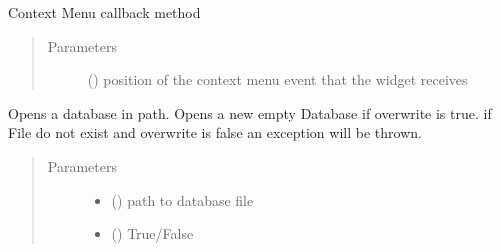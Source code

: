 \documentclass[letterpaper,10pt,english]{sphinxmanual}
\begin{document}
\begin{fulllineitems}
\begin{fulllineitems}
\end{fulllineitems}


\begin{fulllineitems}
\label{\detokenize{api:beamon.ui.main.Main.onCustomContextMenuRequested}}
Context Menu callback method
\begin{quote}\begin{description}
\item[{Parameters}] \leavevmode
{} () \textendash{} position of the context menu event that the widget receives

\end{description}\end{quote}

\end{fulllineitems}


\begin{fulllineitems}
\label{\detokenize{api:beamon.ui.main.Main.open_database}}
Opens a database in path. Opens a new empty Database if overwrite is true. if File do not exist and overwrite
is false an exception will be thrown.
\begin{quote}\begin{description}
\item[{Parameters}] \leavevmode\begin{itemize}
\item {} 
 () \textendash{} path to database file

\item {} 
 () \textendash{} True/False


\end{itemize}
\end{description}
\end{quote}
\end{fulllineitems}
\end{fulllineitems}
\end{document}
